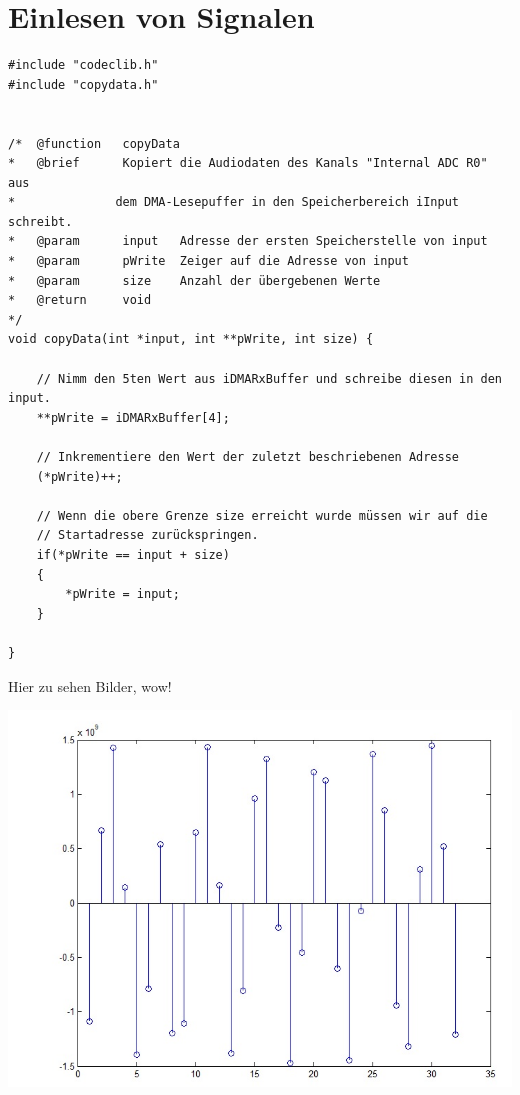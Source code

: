 \chapter{Einlesen von Signalen}

\begin{lstlisting}
#include "codeclib.h"
#include "copydata.h"


/* 	@function 	copyData
* 	@brief 		Kopiert die Audiodaten des Kanals "Internal ADC R0" aus 
*              dem DMA-Lesepuffer in den Speicherbereich iInput schreibt. 
* 	@param 		input	Adresse der ersten Speicherstelle von input 
*	@param 		pWrite	Zeiger auf die Adresse von input
*	@param 		size 	Anzahl der übergebenen Werte
*	@return 	void
*/
void copyData(int *input, int **pWrite, int size) {    

	// Nimm den 5ten Wert aus iDMARxBuffer und schreibe diesen in den input.
	**pWrite = iDMARxBuffer[4];
	
	// Inkrementiere den Wert der zuletzt beschriebenen Adresse
	(*pWrite)++;
	
	// Wenn die obere Grenze size erreicht wurde müssen wir auf die 
	// Startadresse zurückspringen.
	if(*pWrite == input + size)
	{
		*pWrite = input;
	}

}
\end{lstlisting}

Hier zu sehen Bilder, wow!

\begin{center}
\includegraphics[scale=0.8]{Aufgabe1Matlab1.jpg}
\label{fig.Matlab}
\end{center}
